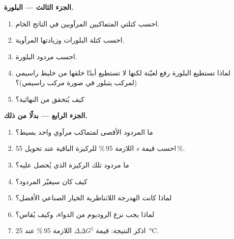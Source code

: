 \begin{problem}
\medskip\noindent\textbf{الجزء الثالث --- البلورة.}
\begin{enumerate}[resume]
  \item احسب كتلتي المتماكبين المرآويين في الناتج الخام.
  \item احسب كتلة البلورات وزيادتها المرآوية.
  \item احسب مردود البلورة.
  \item لماذا تستطيع البلورة رفع  لعيّنة لكنها لا تستطيع أبدًا خلقها من خليط
        راسيمي (لمركب يتبلور في صورة مركب راسيمي)؟
  \item كيف يُتحقق من  النهائية؟
\end{enumerate}

\medskip\noindent\textbf{الجزء الرابع ---  بدلًا من ذلك.}
\begin{enumerate}[resume]
  \item ما المردود الأقصى لمتماكب مرآوي واحد  بسيط؟
  \item احسب قيمة $s$ اللازمة  95\,\% للركيزة الباقية عند تحويل 55\,\%.
  \item ما مردود تلك الركيزة الذي يُحصل عليه؟
  \item كيف كان  سيغيّر المردود؟
  \item لماذا كانت الهدرجة اللاتناظرية الخيار الصناعي الأفضل؟
  \item لماذا يجب نزع الروديوم من الدواء، وكيف يُقاس؟
  \item اذكر النتيجة: قيمة $\Delta\Delta G^\ddagger$ اللازمة  95\,\% عند \qty{25}{\celsius}.
\end{enumerate}
\end{problem}
